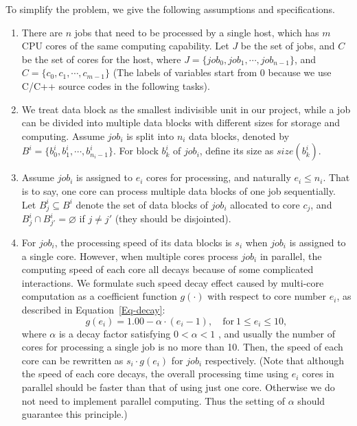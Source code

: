 \documentclass{llncs}
\begin{document}
To simplify the problem, we give the following assumptions and specifications.

\begin{enumerate}

  \item There are $n$ jobs that need to be processed by a single host, which has $m$ CPU cores of the same computing capability. Let $J$ be the set of jobs, and $C$ be the set of cores for the host, where $J = \{job_0, job_1, \cdots, job_{n-1}\}$, and $C = \{c_0, c_1, \cdots, c_{m-1}\}$ (The labels of variables start from 0 because we use C/C++ source codes in the following tasks).
  
  \vspace{2mm} 
  
  \item We treat data block as the smallest indivisible unit in our project, while a job can be divided into multiple data blocks with different sizes for storage and computing. Assume $job_i$ is split into $n_i$ data blocks, denoted by $B^i = \{b^i_{0}, b^i_{1}, \cdots, b^i_{n_i-1}\}$. For block $b^i_{k}$ of $job_i$, define its size as $size(b^i_{k})$.
  
  \vspace{2mm} 
  
  \item Assume $job_i$ is assigned to $e_i$ cores for processing, and naturally $e_i \leq n_i$. That is to say, one core can process multiple data blocks of one job sequentially. Let $B^i_{j}\subseteq B^i$ denote the set of data blocks of $job_i$ allocated to core $c_j$, and $B^i_{j} \cap B^i_{j'} = \varnothing$ if $j \neq j'$ (they should be disjointed). 
  
  \vspace{2mm} 
  
  \item For $job_i$, the processing speed of its data blocks is $s_i$ when $job_i$ is assigned to a single core. However, when multiple cores process $job_i$ in parallel, the computing speed of each core all decays because of some complicated interactions. We formulate such speed decay effect caused by multi-core computation as a coefficient function $g(\cdot)$ with respect to core number $e_i$, as described in Equation~\eqref{Eq-decay}:
    \begin{equation} \label{Eq-decay}
    g (e_i) = 1.00 - \alpha \cdot (e_i-1), \quad  \text{for} \ 1 \leq e_i \leq 10,
    \end{equation}
  where $\alpha$ is a decay factor satisfying $0 < \alpha < 1$ , and usually the number of cores for processing a single job is no more than 10. Then, the speed of each core can be rewritten as $s_i \cdot g(e_i)$ for $job_i$ respectively. (Note that although the speed of each core decays, the overall processing time using $e_i$ cores in parallel should be faster than that of using just one core. Otherwise we do not need to implement parallel computing. Thus the setting of $\alpha$ should guarantee this principle.)
  

\end{enumerate}
\end{document}
